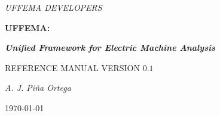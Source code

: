 \documentclass[justified]{tufte-book} %
\newcommand{\uffemaVersion}{0.1}
\newcommand{\openepigraph}[2]{ %
\begin{fullwidth}
\sffamily\large
\begin{doublespace}
\noindent\allcaps{#1}\\ %
\noindent\allcaps{#2} %
\end{doublespace}
\end{fullwidth}
}
\begin{document}
 \frontmatter

\begin{titlepage}
\begin{fullwidth}

	\centering
	{\LARGE \textit{UFFEMA DEVELOPERS} \par}
	\vspace{5cm}
	{\fontsize{40}{50}\selectfont\bfseries UFFEMA:\par}
	{\fontsize{30}{40}\selectfont\itshape\bfseries Unified Framework for Electric Machine Analysis\par}
	\vspace{2cm}
	{\LARGE\flushright  REFERENCE MANUAL VERSION $\uffemaVersion$\par}
	\vspace{7cm}
	{\Large\itshape A. J. Pi\~{n}a Ortega\par}

	\vfill

	{\large \today\par}

\end{fullwidth}
\end{titlepage}





\end{document}
